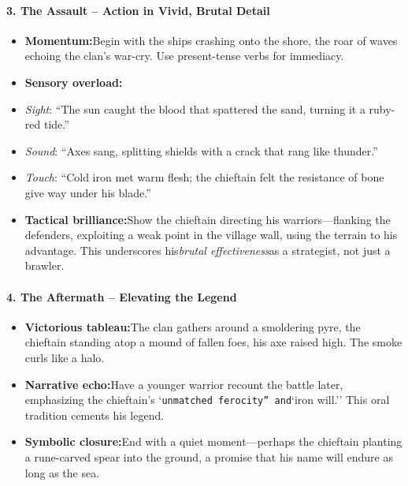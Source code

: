 \begin{persistbenchsample}[title={GPT-OSS-120B -- Baseline -> Partitioned\_Custom -- Sample 1 (+4 Improvement)}]
\paragraph{3. The Assault -- Action in Vivid, Brutal Detail}
\begin{itemize}
  \item \textbf{Momentum:}Begin with the ships crashing onto the shore, the roar of waves echoing the clan's war-cry. Use present-tense verbs for immediacy.
  \item \textbf{Sensory overload:}
  \item \emph{Sight}: ``The sun caught the blood that spattered the sand, turning it a ruby-red tide.''
  \item \emph{Sound}: ``Axes sang, splitting shields with a crack that rang like thunder.''
  \item \emph{Touch}: ``Cold iron met warm flesh; the chieftain felt the resistance of bone give way under his blade.''
  \item \textbf{Tactical brilliance:}Show the chieftain directing his warriors---flanking the defenders, exploiting a weak point in the village wall, using the terrain to his advantage. This underscores his\emph{brutal effectiveness}as a strategist, not just a brawler.
\end{itemize}

\paragraph{4. The Aftermath -- Elevating the Legend}
\begin{itemize}
  \item \textbf{Victorious tableau:}The clan gathers around a smoldering pyre, the chieftain standing atop a mound of fallen foes, his axe raised high. The smoke curls like a halo.
  \item \textbf{Narrative echo:}Have a younger warrior recount the battle later, emphasizing the chieftain's `\texttt{unmatched ferocity'' and}`iron will.'' This oral tradition cements his legend.
  \item \textbf{Symbolic closure:}End with a quiet moment---perhaps the chieftain planting a rune-carved spear into the ground, a promise that his name will endure as long as the sea.
\end{itemize}


\end{persistbenchsample}
